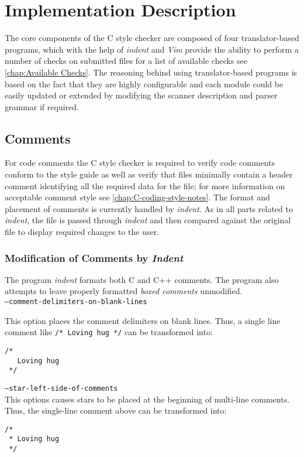 \chapter{Implementation Description}
\label{chap:IMPLEMENT}

The core components of the C style checker are composed of four 
translator-based programs, which with the help of \emph{indent} and \emph{Vim}
 provide the ability to perform a number of checks on submitted files for a list of 
available checks see \autoref{chap:Available Checks}. The reasoning behind 
using translator-based programs is based on the fact that they are highly 
configurable and each module could be easily updated or extended by modifying 
the scanner description and parser grammar if required. 

\section{Comments}

For code comments the C style checker is required to verify code comments 
conform to the style guide as well as verify that files minimally contain a 
header comment identifying all the required data for the file; for more 
information on acceptable comment style see 
\autoref{chap:C-coding-style-notes}. The format and placement of comments is
currently handled by \emph{indent}. As in all parts related to \emph{indent}, the file is 
passed through \emph{indent} and then compared against the original file to display 
required changes to the user. 

\subsection{Modification of Comments by \emph{Indent}}

The program \emph{indent} formats both C and C++ comments. The program 
also attempts to leave properly formatted \emph{boxed comments} 
unmodified.\\

\texttt{--comment-delimiters-on-blank-lines}
    
\noindent This option places the comment delimiters on blank lines.
Thus, a single line comment like \verb|/* Loving hug */| can be
transformed into:
\begin{verbatim}
/*
   Loving hug
 */
\end{verbatim}

\texttt{--star-left-side-of-comments} \\
\noindent This options causes stars to be placed at the beginning of multi-line
comments. Thus, the single-line comment above can be transformed into:
\begin{verbatim}
/*
 * Loving hug
 */
\end{verbatim}

